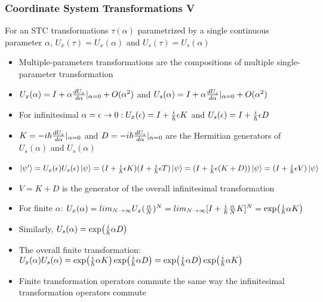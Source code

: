 \documentclass[8pt,t,mathserif,aspectratio=169]{beamer}
\begin{document}
\begin{frame}
  \frametitle{Coordinate System Transformations V}
  \vspace{1mm}
  For an STC transformations $\tau(\alpha)$ parametrized by a single continuous parameter $\alpha$, $U_x(\tau) = U_x(\alpha)$ and $U_s(\tau) = U_s(\alpha)$
  \begin{itemize}
    \item Multiple-parameters transformations are the compositions of multiple single-parameter transformation
    \item $U_x(\alpha) = I + \alpha {d U_x \over d\alpha}|_{\alpha = 0} + O(\alpha^2)$ and $U_s(\alpha) = I + \alpha {d U_s \over d\alpha}|_{\alpha = 0} + O(\alpha^2)$
    \item For infinitesimal $\alpha = \epsilon \to 0: U_x(\epsilon) = I + {i \over \hbar} \epsilon K$ and $U_s(\epsilon) = I + {i \over \hbar} \epsilon D$
    \item $K = -i \hbar {d U_x \over d\alpha}|_{\alpha = 0}$ and $D = -i \hbar {d U_s \over d\alpha}|_{\alpha = 0}$ are the Hermitian generators of $U_s(\alpha)$ and $U_s(\alpha)$
    \item $\ket{\psi'} = U_x(\epsilon) U_s(\epsilon) \ket{\psi} = (I + {i \over \hbar} \epsilon K)(I + {i \over \hbar} \epsilon T) \ket{\psi} = (I + {i \over \hbar} \epsilon (K + D)) \ket{\psi} = (I + {i \over \hbar} \epsilon V) \ket{\psi}$
    \item $V = K + D$ is the generator of the overall infinitesimal transformation
    \item For finite $\alpha$: $U_x(\alpha) = lim_{N \to \infty} U_x({\alpha \over N})^{N} = lim_{N \to \infty} [I + {i \over \hbar} {\alpha \over N} K]^{N} = \exp({i \over \hbar} \alpha K)$
    \item Similarly, $U_s(\alpha) = \exp({i \over \hbar} \alpha D)$
    \item The overall finite transformation: $U_x(\alpha) U_s(\alpha) = \exp({i \over \hbar} \alpha K) \exp({i \over \hbar} \alpha D) = \exp({i \over \hbar} \alpha D) \exp({i \over \hbar} \alpha K)$
    \item Finite transformation operators commute the same way the infinitesimal transformation operators commute
  \end{itemize}
\end{frame}
\end{document}
